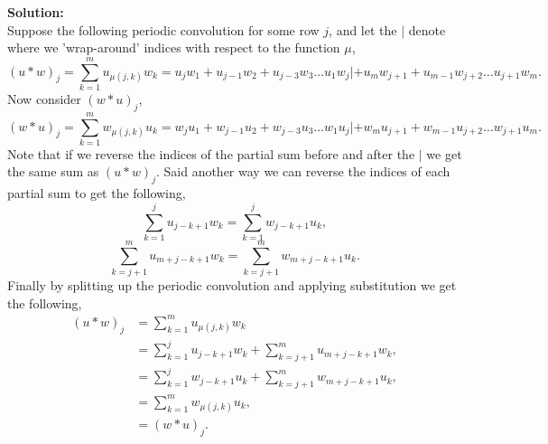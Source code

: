 \documentclass[12pt]{article}
\makeatletter
\theoremstyle{homework}
\newenvironment{exercise}[1]
{\def\@currentlabel{#1}\exercisecore}
{\endexercisecore}
\newcommand{\localhead}[1]{\par\smallskip\noindent\textbf{#1}\nobreak\\}%
\newcommand\solution{\localhead{Solution:}}
\makeatother
\begin{document}
\begin{exercise}{P23}
\begin{enumerate}
    \solution Suppose the following periodic convolution for some row $j$, and let the $|$ denote where we 'wrap-around' indices with respect to the function $\mu$,
    \begin{equation*}
      (u*w)_j = \sum_{k = 1}^m u_{\mu(j,k)}w_k = u_jw_1 + u_{j-1}w_2 + u_{j-3}w_3 \dots u_1w_j| + u_mw_{j+1} + u_{m-1}w_{j+2} \dots u_{j+1}w_{m}.
    \end{equation*}
    Now consider $(w*u)_j$,
    \begin{equation*}
      (w*u)_j = \sum_{k = 1}^m w_{\mu(j,k)}u_k = w_ju_1 + w_{j-1}u_2 + w_{j-3}u_3 \dots w_1u_j| + w_mu_{j+1} + w_{m-1}u_{j+2} \dots w_{j+1}u_{m} .
    \end{equation*}
    Note that if we reverse the indices of the partial sum before and after the $|$ we get the same sum as $(u*w)_j$. Said another way we can reverse the indices of each partial sum to get 
    the following, 
    \begin{equation*}
      \sum_{k = 1}^j u_{j - k + 1}w_k = \sum_{k = 1}^j w_{j - k + 1}u_k,
    \end{equation*}
    \begin{equation*}
      \sum_{k = j+1}^m u_{m + j - k + 1}w_k = \sum_{k = j+1}^m w_{m + j - k + 1}u_k.
    \end{equation*}
    Finally by splitting up the periodic convolution and applying substitution we get the following, 
    \begin{align*}
      (u*w)_j &= \sum_{k = 1}^m u_{\mu(j,k)}w_k \\
      &= \sum_{k = 1}^j u_{j - k + 1}w_k + \sum_{k = j+1}^m u_{m + j - k + 1}w_k,\\
      &= \sum_{k = 1}^j w_{j - k + 1}u_k + \sum_{k = j+1}^m w_{m + j - k + 1}u_k,\\
      &= \sum_{k = 1}^m w_{\mu(j,k)}u_k, \\
      &=  (w*u)_j.
    \end{align*}

    \vspace{1in}




\end{enumerate}
\end{exercise}
\end{document}
